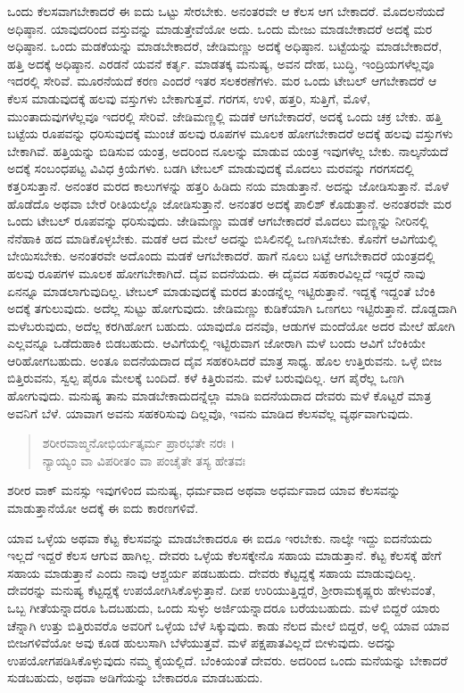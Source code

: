 ಒಂದು ಕೆಲಸವಾಗಬೇಕಾದರೆ ಈ ಐದು ಒಟ್ಟು ಸೇರಬೇಕು. ಅನಂತರವೇ ಆ ಕೆಲಸ ಆಗ ಬೇಕಾದರೆ. ಮೊದಲನೆಯದೆ ಅಧಿಷ್ಠಾನ. ಯಾವುದರಿಂದ ವಸ್ತುವನ್ನು ಮಾಡುತ್ತೇವೆಯೋ ಅದು. ಒಂದು ಮೇಜು ಮಾಡಬೇಕಾದರೆ ಅದಕ್ಕೆ ಮರ ಅಧಿಷ್ಠಾನ. ಒಂದು ಮಡಕೆಯನ್ನು ಮಾಡಬೇಕಾದರೆ, ಜೇಡಿಮಣ್ಣು ಅದಕ್ಕೆ ಅಧಿಷ್ಠಾನ. ಬಟ್ಟೆಯನ್ನು ಮಾಡಬೇಕಾದರೆ, ಹತ್ತಿ ಅದಕ್ಕೆ ಅಧಿಷ್ಠಾನ. ಎರಡನೆ ಯವನೆ ಕರ್ತೃ. ಮಾಡತಕ್ಕ ಮನುಷ್ಯ, ಅವನ ದೇಹ, ಬುದ್ಧಿ, ಇಂದ್ರಿಯಗಳೆಲ್ಲವೂ ಇದರಲ್ಲಿ ಸೇರಿವೆ. ಮೂರನೆಯದೆ ಕರಣ ಎಂದರೆ ಇತರ ಸಲಕರಣೆಗಳು. ಮರ ಒಂದು ಟೇಬಲ್ ಆಗಬೇಕಾದರೆ ಆ ಕೆಲಸ ಮಾಡುವುದಕ್ಕೆ ಹಲವು ವಸ್ತುಗಳು ಬೇಕಾಗುತ್ತವೆ. ಗರಗಸ, ಉಳಿ, ಹತ್ತರಿ, ಸುತ್ತಿಗೆ, ಮೊಳೆ, ಮುಂತಾದುವುಗಳೆಲ್ಲವೂ ಇದರಲ್ಲಿ ಸೇರಿವೆ. ಜೇಡಿಮಣ್ಣಲ್ಲಿ ಮಡಕೆ ಆಗಬೇಕಾದರೆ, ಅದಕ್ಕೆ ಒಂದು ಚಕ್ರ ಬೇಕು. ಹತ್ತಿ ಬಟ್ಟೆಯ ರೂಪವನ್ನು ಧರಿಸುವುದಕ್ಕೆ ಮುಂಚೆ ಹಲವು ರೂಪಗಳ ಮೂಲಕ ಹೋಗಬೇಕಾದರೆ ಅದಕ್ಕೆ ಹಲವು ವಸ್ತುಗಳು ಬೇಕಾಗಿವೆ. ಹತ್ತಿಯನ್ನು ಬಿಡಿಸುವ ಯಂತ್ರ, ಅದರಿಂದ ನೂಲನ್ನು ಮಾಡುವ ಯಂತ್ರ ಇವುಗಳೆಲ್ಲ ಬೇಕು. ನಾಲ್ಕನೆಯದೆ ಅದಕ್ಕೆ ಸಂಬಂಧಪಟ್ಟ ವಿವಿಧ ಕ್ರಿಯೆಗಳು. ಬಡಗಿ ಟೇಬಲ್ ಮಾಡುವುದಕ್ಕೆ ಮೊದಲು ಮರವನ್ನು ಗರಗಸದಲ್ಲಿ ಕತ್ತರಿಸುತ್ತಾನೆ. ಅನಂತರ ಮರದ ಕಾಲುಗಳನ್ನು ಹತ್ತರಿ ಹಿಡಿದು ನಯ ಮಾಡುತ್ತಾನೆ. ಅದನ್ನು ಜೋಡಿಸುತ್ತಾನೆ. ಮೊಳೆ ಹೊಡೆದೊ ಅಥವಾ ಬೇರೆ ರೀತಿಯಲ್ಲೊ ಜೋಡಿಸುತ್ತಾನೆ. ಅನಂತರ ಅದಕ್ಕೆ ಪಾಲಿಶ್ ಕೊಡುತ್ತಾನೆ. ಅನಂತರವೇ ಮರ ಒಂದು ಟೇಬಲ್ ರೂಪವನ್ನು ಧರಿಸುವುದು. ಜೇಡಿಮಣ್ಣು ಮಡಕೆ ಆಗಬೇಕಾದರೆ ಮೊದಲು ಮಣ್ಣನ್ನು ನೀರಿನಲ್ಲಿ ನೆನೆಹಾಕಿ ಹದ ಮಾಡಿಕೊಳ್ಳಬೇಕು. ಮಡಕೆ ಆದ ಮೇಲೆ ಅದನ್ನು ಬಿಸಿಲಿನಲ್ಲಿ ಒಣಗಿಸಬೇಕು. ಕೊನೆಗೆ ಆವಿಗೆಯಲ್ಲಿ ಬೇಯಿಸಬೇಕು. ಅನಂತರವೇ ಅದೊಂದು ಮಡಕೆ ಆಗಬೇಕಾದರೆ. ಹಾಗೆ ನೂಲು ಬಟ್ಟೆ ಆಗಬೇಕಾದರೆ ಯಂತ್ರದಲ್ಲಿ ಹಲವು ರೂಪಗಳ ಮೂಲಕ ಹೋಗಬೇಕಾಗಿದೆ. ದೈವ ಐದನೆಯದು. ಈ ದೈವದ ಸಹಕಾರವಿಲ್ಲದೆ ಇದ್ದರೆ ನಾವು ಏನನ್ನೂ ಮಾಡಲಾಗುವುದಿಲ್ಲ. ಟೇಬಲ್ ಮಾಡುವುದಕ್ಕೆ ಮರದ ತುಂಡನ್ನೆಲ್ಲ ಇಟ್ಟಿರುತ್ತಾನೆ. ಇದ್ದಕ್ಕೆ ಇದ್ದಂತೆ ಬೆಂಕಿ ಅದಕ್ಕೆ ತಗುಲುವುದು. ಅದೆಲ್ಲ ಸುಟ್ಟು ಹೋಗುವುದು. ಜೇಡಿಮಣ್ಣು ಕುಡಿಕೆಯಾಗಿ ಒಣಗಲು ಇಟ್ಟಿರುತ್ತಾನೆ. ದೊಡ್ಡದಾಗಿ ಮಳೆಬರುವುದು, ಅದೆಲ್ಲ ಕರಗಿಹೋಗ ಬಹುದು. ಯಾವುದೊ ದನವೊ, ಆಡುಗಳ ಮಂದೆಯೋ ಅದರ ಮೇಲೆ ಹೋಗಿ ಎಲ್ಲವನ್ನೂ ಒಡೆದುಹಾಕಿ ಬಿಡಬಹುದು. ಆವಿಗೆಯಲ್ಲಿ ಇಟ್ಟಿರುವಾಗ ಜೋರಾಗಿ ಮಳೆ ಬಂದು ಆವಿಗೆ ಬೆಂಕಿಯೇ ಆರಿಹೋಗಬಹುದು. ಅಂತೂ ಐದನೆಯದಾದ ದೈವ ಸಹಕರಿಸಿದರೆ ಮಾತ್ರ ಸಾಧ್ಯ. ಹೊಲ ಉತ್ತಿರುವನು. ಒಳ್ಳೆ ಬೀಜ ಬಿತ್ತಿರುವನು, ಸ್ವಲ್ಪ ಪೈರೂ ಮೇಲಕ್ಕೆ ಬಂದಿದೆ. ಕಳೆ ಕಿತ್ತಿರುವನು. ಮಳೆ ಬರುವುದಿಲ್ಲ. ಆಗ ಪೈರೆಲ್ಲ ಒಣಗಿ ಹೋಗುವುದು. ಮನುಷ್ಯ ತಾನು ಮಾಡಬೇಕಾದುದನ್ನೆಲ್ಲಾ ಮಾಡಿ ಐದನೆಯದಾದ ದೇವರು ಮಳೆ ಕೊಟ್ಟರೆ ಮಾತ್ರ ಅವನಿಗೆ ಬೆಳೆ. ಯಾವಾಗ ಅವನು ಸಹಕರಿಸುವು ದಿಲ್ಲವೊ, ಇವನು ಮಾಡಿದ ಕೆಲಸವೆಲ್ಲ ವ್ಯರ್ಥವಾಗುವುದು.

\begin{verse}
ಶರೀರವಾಙ್ಮನೋಭಿರ್ಯತ್ಕರ್ಮ ಪ್ರಾರಭತೇ ನರಃ ।\\ನ್ಯಾಯ್ಯಂ ವಾ ವಿಪರೀತಂ ವಾ ಪಂಚೈತೇ ತಸ್ಯ ಹೇತವಃ 
\end{verse}

{\small ಶರೀರ ವಾಕ್ ಮನಸ್ಸು ಇವುಗಳಿಂದ ಮನುಷ್ಯ, ಧರ್ಮವಾದ ಅಥವಾ ಅಧರ್ಮವಾದ ಯಾವ ಕೆಲಸವನ್ನು ಮಾಡುತ್ತಾನೆಯೋ ಅದಕ್ಕೆ ಈ ಐದು ಕಾರಣಗಳಿವೆ.}

ಯಾವ ಒಳ್ಳೆಯ ಅಥವಾ ಕೆಟ್ಟ ಕೆಲಸವನ್ನು ಮಾಡಬೇಕಾದರೂ ಈ ಐದೂ ಇರಬೇಕು. ನಾಲ್ಕೇ ಇದ್ದು ಐದನೆಯದು ಇಲ್ಲದೆ ಇದ್ದರೆ ಕೆಲಸ ಆಗುವ ಹಾಗಿಲ್ಲ. ದೇವರು ಒಳ್ಳೆಯ ಕೆಲಸಕ್ಕೇನೊ ಸಹಾಯ ಮಾಡುತ್ತಾನೆ. ಕೆಟ್ಟ ಕೆಲಸಕ್ಕೆ ಹೇಗೆ ಸಹಾಯ ಮಾಡುತ್ತಾನೆ ಎಂದು ನಾವು ಆಶ್ಚರ್ಯ ಪಡಬಹುದು. ದೇವರು ಕೆಟ್ಟದ್ದಕ್ಕೆ ಸಹಾಯ ಮಾಡುವುದಿಲ್ಲ. ದೇವರನ್ನು ಮನುಷ್ಯ ಕೆಟ್ಟದ್ದಕ್ಕೆ ಉಪಯೋಗಿಸಿಕೊಳ್ಳುತ್ತಾನೆ. ದೀಪ ಉರಿಯುತ್ತಿದ್ದರೆ, ಶ್ರೀರಾಮಕೃಷ್ಣರು ಹೇಳುವಂತೆ, ಒಬ್ಬ ಗೀತೆಯನ್ನಾದರೂ ಓದಬಹುದು, ಒಂದು ಸುಳ್ಳು ಅರ್ಜಿಯನ್ನಾದರೂ ಬರೆಯಬಹುದು. ಮಳೆ ಬಿದ್ದರೆ ಯಾರು ಚೆನ್ನಾಗಿ ಉತ್ತು ಬಿತ್ತಿರುವರೊ ಅವರಿಗೆ ಒಳ್ಳೆಯ ಬೆಳೆ ಸಿಕ್ಕುವುದು. ಕಾಡು ನೆಲದ ಮೇಲೆ ಬಿದ್ದರೆ, ಅಲ್ಲಿ ಯಾವ ಯಾವ ಬೀಜಗಳಿವೆಯೋ ಅವು ಕೂಡ ಹುಲುಸಾಗಿ ಬೆಳೆಯುತ್ತವೆ. ಮಳೆ ಪಕ್ಷಪಾತವಿಲ್ಲದೆ ಬೀಳುವುದು. ಅದನ್ನು ಉಪಯೋಗಪಡಿಸಿಕೊಳ್ಳುವುದು ನಮ್ಮ ಕೈಯಲ್ಲಿದೆ. ಬೆಂಕಿಯಂತೆ ದೇವರು. ಅದರಿಂದ ಒಂದು ಮನೆಯನ್ನು ಬೇಕಾದರೆ ಸುಡಬಹುದು, ಅಥವಾ ಅಡಿಗೆಯನ್ನು ಬೇಕಾದರೂ ಮಾಡಬಹುದು.

